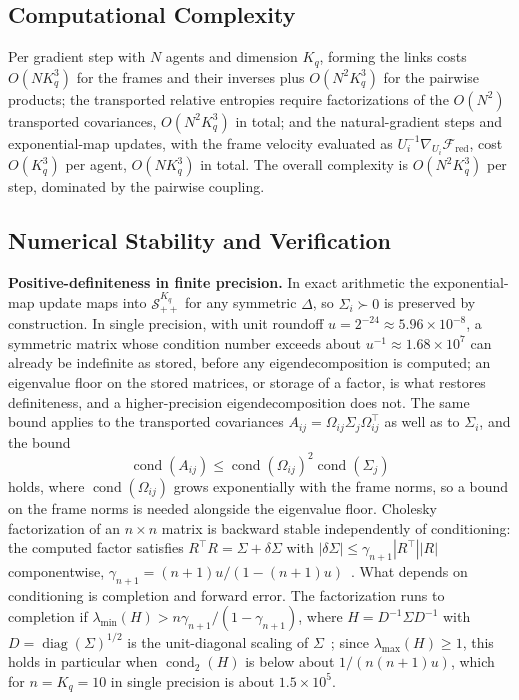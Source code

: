 \documentclass[11pt]{article}
\begin{document}
\subsection*{Computational Complexity}

Per gradient step with $N$ agents and dimension $K_q$, forming the links costs $O(N K_q^3)$ for the frames and their inverses plus $O(N^2 K_q^3)$ for the pairwise products; the transported relative entropies require factorizations of the $O(N^2)$ transported covariances, $O(N^2 K_q^3)$ in total; and the natural-gradient steps and exponential-map updates, with the frame velocity evaluated as $U_i^{-1}\nabla_{U_i}\mathcal{F}_{\mathrm{red}}$, cost $O(K_q^3)$ per agent, $O(N K_q^3)$ in total. The overall complexity is $O(N^2 K_q^3)$ per step, dominated by the pairwise coupling.

\subsection*{Numerical Stability and Verification}

\textbf{Positive-definiteness in finite precision.} In exact arithmetic the exponential-map update maps into $\mathcal{S}_{++}^{K_q}$ for any symmetric $\Delta$, so $\Sigma_i \succ 0$ is preserved by construction. In single precision, with unit roundoff $u = 2^{-24} \approx 5.96 \times 10^{-8}$, a symmetric matrix whose condition number exceeds about $u^{-1} \approx 1.68 \times 10^{7}$ can already be indefinite as stored, before any eigendecomposition is computed; an eigenvalue floor on the stored matrices, or storage of a factor, is what restores definiteness, and a higher-precision eigendecomposition does not. The same bound applies to the transported covariances $A_{ij} = \Omega_{ij}\Sigma_j\Omega_{ij}^\top$ as well as to $\Sigma_i$, and the bound
\begin{equation}
\operatorname{cond}(A_{ij}) \le \operatorname{cond}(\Omega_{ij})^2\operatorname{cond}(\Sigma_j)
\end{equation}
holds, where $\operatorname{cond}(\Omega_{ij})$ grows exponentially with the frame norms, so a bound on the frame norms is needed alongside the eigenvalue floor. Cholesky factorization of an $n \times n$ matrix is backward stable independently of conditioning: the computed factor satisfies $R^\top R = \Sigma + \delta\Sigma$ with $|\delta\Sigma| \le \gamma_{n+1}|R^\top||R|$ componentwise, $\gamma_{n+1} = (n+1)u/(1 - (n+1)u)$~\cite[Thm.~10.3]{Higham2002}. What depends on conditioning is completion and forward error. The factorization runs to completion if $\lambda_{\min}(H) > n\gamma_{n+1}/(1 - \gamma_{n+1})$, where $H = D^{-1}\Sigma D^{-1}$ with $D = \operatorname{diag}(\Sigma)^{1/2}$ is the unit-diagonal scaling of $\Sigma$~\cite[Thm.~10.7]{Higham2002}; since $\lambda_{\max}(H) \ge 1$, this holds in particular when $\operatorname{cond}_2(H)$ is below about $1/(n(n+1)u)$, which for $n = K_q = 10$ in single precision is about $1.5 \times 10^5$.
\end{document}
